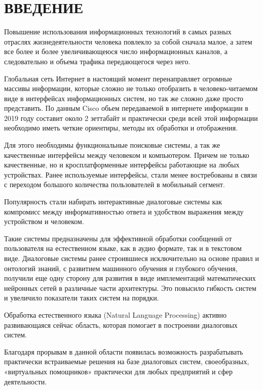 \chapter*{ВВЕДЕНИЕ}
Повышение использования информационных технологий в самых разных отраслях жизнедеятельности человека повлекло за собой сначала малое, а затем все более и более увеличивающеюся число информационных каналов, а следовательно и объема трафика передающегося через него.  

Глобальная сеть Интернет в настоящий момент перенаправляет огромные массивы информации, которые сложно не только отобразить в человеко-читаемом виде в интерфейсах информационных систем, но так же сложно даже просто представить. 
По данным Cisco обьем передаваемой в интернете информации в 2019 году составит около 2 зеттабайт \cite{cisco2018cisco} и практически среди всей этой информации необходимо иметь четкие ориентиры, методы их обработки и отображения. 

Для этого необходимы функциональные поисковые системы, а так же качественные интерфейсы между человеком и компьютером. Причем не только качественные, но и кросплатформенные интерфейсы работающие на любых устройствах. Ранее используемые интерфейсы, стали менее востребованы в связи с переходом большого количества пользователей в мобильный сегмент. 

Популярность стали набирать интерактивные диалоговые системы как компромисс  между информативностью ответа и удобством выражения между устройством и человеком. 

Такие системы предназначены для эффективной обработки сообщений от пользователя на естественном языке, как в аудио формате, так и в текстовом виде. Диалоговые системы ранее строившиеся исключительно на основе правил и онтологий знаний, с развитием машинного обучения и глубокого обучения, получили еще одну сторону для развития в виде имплементаций математических нейронных сетей в различные части архитектуры. Это повысило гибкость систем и увеличило показатели таких систем на порядки. 

Обработка естественного языка (Natural Language Processing) активно развивающаяся сейчас область, которая помогает в построении диалоговых систем.

Благодаря прорывам в данной области появилась возможность разрабатывать практически встраиваемые решения на базе диалоговых систем, своеобразных, «виртуальных помощников» практически для любых предприятий и сфер деятельности. 

